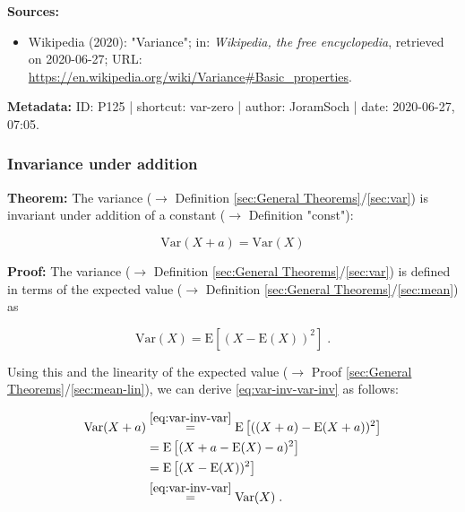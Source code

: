 \documentclass[a4paper,12pt,twoside]{book}
\begin{document}
\vspace{1em}
\textbf{Sources:}
\begin{itemize}
\item Wikipedia (2020): "Variance"; in: \textit{Wikipedia, the free encyclopedia}, retrieved on 2020-06-27; URL: \url{https://en.wikipedia.org/wiki/Variance#Basic_properties}.
\end{itemize}


\vspace{1em}
\textbf{Metadata:} ID: P125 | shortcut: var-zero | author: JoramSoch | date: 2020-06-27, 07:05.
\vspace{1em}



\subsubsection[\textbf{Invariance under addition}]{Invariance under addition} \label{sec:var-inv}
\setcounter{equation}{0}

\textbf{Theorem:} The variance ($\rightarrow$ Definition \ref{sec:General Theorems}/\ref{sec:var}) is invariant under addition of a constant ($\rightarrow$ Definition "const"):

\begin{equation} \label{eq:var-inv-var-inv}
\mathrm{Var}(X+a) = \mathrm{Var}(X)
\end{equation}


\vspace{1em}
\textbf{Proof:} The variance ($\rightarrow$ Definition \ref{sec:General Theorems}/\ref{sec:var}) is defined in terms of the expected value ($\rightarrow$ Definition \ref{sec:General Theorems}/\ref{sec:mean}) as

\begin{equation} \label{eq:var-inv-var}
\mathrm{Var}(X) = \mathrm{E}\left[ (X-\mathrm{E}(X))^2 \right] \; .
\end{equation}

Using this and the linearity of the expected value ($\rightarrow$ Proof \ref{sec:General Theorems}/\ref{sec:mean-lin}), we can derive \eqref{eq:var-inv-var-inv} as follows:

\begin{equation} \label{eq:var-inv-var-inv-qed}
\begin{split}
\mathrm{Var}(X+a) &\overset{\eqref{eq:var-inv-var}}{=} \mathrm{E}\left[ ((X+a)-\mathrm{E}(X+a))^2 \right] \\
&= \mathrm{E}\left[ (X + a - \mathrm{E}(X) - a)^2 \right] \\
&= \mathrm{E}\left[ (X-\mathrm{E}(X))^2 \right] \\
&\overset{\eqref{eq:var-inv-var}}{=} \mathrm{Var}(X) \; . \\
\end{split}
\end{equation}
\end{document}
